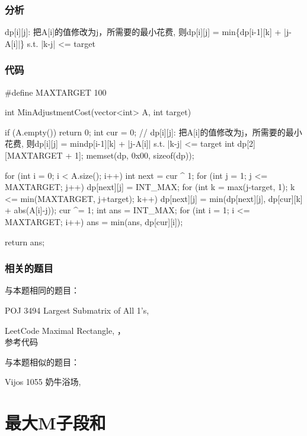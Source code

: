 \subsubsection{分析}
dp[i][j]: 把A[i]的值修改为j，所需要的最小花费, 则dp[i][j] = min\{dp[i-1][k] + 
	|j-A[i]|\}  s.t. |k-j| <= target

\subsubsection{代码}
\begin{Codex}[label=MinAdjustmentCost.c]
	#define MAXTARGET 100
	
	int MinAdjustmentCost(vector<int> A, int target) {
		if (A.empty()) 
		return 0;
		int cur = 0;
		// dp[i][j]: 把A[i]的值修改为j，所需要的最小花费, 则dp[i][j] = min{dp[i-1][k] 
			+ |j-A[i]|}  s.t. |k-j| <= target
		int dp[2][MAXTARGET + 1];
		memset(dp, 0x00, sizeof(dp));
		
		for (int i = 0; i < A.size(); i++) {
			int next = cur ^ 1;
			for (int j = 1; j <= MAXTARGET; j++) {
				dp[next][j] = INT_MAX;
				for (int k = max(j-target, 1); k <= min(MAXTARGET, j+target); 
				k++)
				dp[next][j] = min(dp[next][j], dp[cur][k] + abs(A[i]-j));
			}
			cur ^= 1;
		}
		int ans = INT_MAX;
		for (int i = 1; i <= MAXTARGET; i++)
		ans = min(ans, dp[cur][i]);
		
		return ans;
	}
\end{Codex}

\subsubsection{相关的题目}
与本题相同的题目：
\begindot
\item POJ 3494 Largest Submatrix of All 1's, 
\item LeetCode Maximal Rectangle, 
，\\ 
参考代码
\myenddot

与本题相似的题目：
\begindot
\item Vijos 1055 奶牛浴场, 
\myenddot

\section{最大M子段和} %
\label{sec:mmss}

